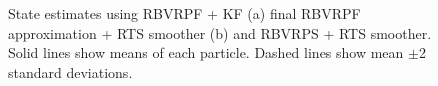 \documentclass[journal]{IEEEtran}
\begin{document}
\begin{figure}[!t]
\centering
{} \\
 \\
\caption{State estimates using RBVRPF + KF (a) final RBVRPF approximation + RTS smoother (b) and RBVRPS + RTS smoother. Solid lines show means of each particle. Dashed lines show mean $\pm$2 standard deviations.}
\label{fig:example_state}
\end{figure}
\end{document}
